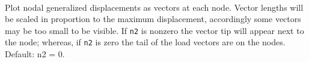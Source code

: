  \\{\smallskip}
\headb

Plot nodal generalized displacements as vectors at
each node.  Vector lengths will be scaled in proportion to
the maximum displacement, accordingly some vectors may be
too small to be visible.  If {\tt n2} is nonzero the vector tip
will appear next to the node; whereas, if {\tt n2} is zero the
tail of the load vectors are on the nodes.  Default: n2 = 0.
\vfill
\eject
